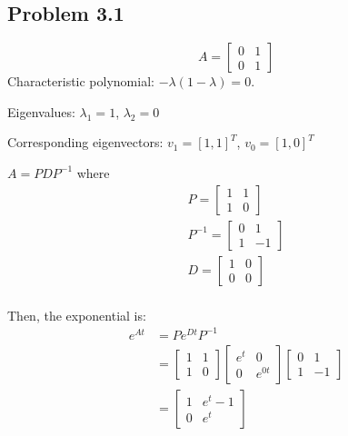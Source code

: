 \documentclass{homework}
\begin{document}
\subsection{Problem 3.1}
\begin{letterenum}
    \item 
    \begin{equation}
        A = \begin{bmatrix}
            0 & 1 \\ 0 & 1
        \end{bmatrix}
    \end{equation}
    Characteristic polynomial: $-\lambda(1 - \lambda) = 0$.

    Eigenvalues: $\lambda_1 = 1$, $\lambda_2 = 0$

    Corresponding eigenvectors: $v_1 = [1, 1]^T$, $v_0 = [1, 0]^T$

    $A = PDP^{-1}$ where
    \begin{align}
        P = \begin{bmatrix}
            1 & 1 \\ 1 & 0
        \end{bmatrix} \\
        P^{-1} = \begin{bmatrix}
            0 & 1 \\ 1 & -1
        \end{bmatrix} \\
        D = \begin{bmatrix}
            1 & 0 \\ 0 & 0
        \end{bmatrix} \\
    \end{align}

    Then, the exponential is:
    \begin{align}
        e^{At} &= P e^{Dt} P^{-1} \\
            &= \begin{bmatrix}
                1 & 1 \\ 1 & 0
            \end{bmatrix} \begin{bmatrix}
                e^t & 0 \\ 0 & e^{0t}
            \end{bmatrix} \begin{bmatrix}
                0 & 1 \\ 1 & -1
            \end{bmatrix} \\
            &= \boxed{\begin{bmatrix}
                1 & e^t - 1 \\ 0 & e^{t}
            \end{bmatrix}}
    \end{align}


\end{letterenum}
\end{document}
